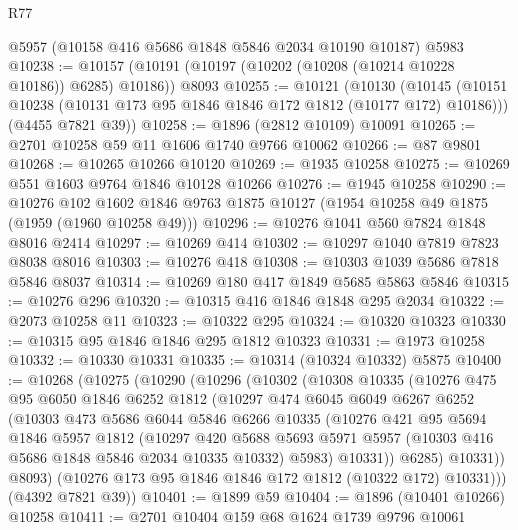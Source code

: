 \begin{lexlean}{R77}
\begin{coremodule}
    @5957
    (@10158 @416 @5686 @1848 @5846 @2034 @10190 @10187)
    @5983
@10238 := @10157 (@10191 (@10197 (@10202 (@10208 (@10214 @10228 @10186)) @6285) @10186)) @8093
@10255 := @10121
    (@10130
      (@10145 (@10151 @10238 (@10131 @173 @95 @1846 @1846 @172 @1812 (@10177 @172) @10186)))
      (@4455 @7821 @39))
@10258 := @1896 (@2812 @10109) @10091
@10265 := @2701 @10258 @59 @11 @1606 @1740 @9766 @10062
@10266 := @87 @9801
@10268 := @10265 @10266 @10120
@10269 := @1935 @10258
@10275 := @10269 @551 @1603 @9764 @1846 @10128 @10266
@10276 := @1945 @10258
@10290 := @10276
    @102
    @1602
    @1846
    @9763
    @1875
    @10127
    (@1954 @10258 @49 @1875 (@1959 (@1960 @10258 @49)))
@10296 := @10276 @1041 @560 @7824 @1848 @8016 @2414
@10297 := @10269 @414
@10302 := @10297 @1040 @7819 @7823 @8038 @8016
@10303 := @10276 @418
@10308 := @10303 @1039 @5686 @7818 @5846 @8037
@10314 := @10269 @180 @417 @1849 @5685 @5863 @5846
@10315 := @10276 @296
@10320 := @10315 @416 @1846 @1848 @295 @2034
@10322 := @2073 @10258 @11
@10323 := @10322 @295
@10324 := @10320 @10323
@10330 := @10315 @95 @1846 @1846 @295 @1812 @10323
@10331 := @1973 @10258
@10332 := @10330 @10331
@10335 := @10314 (@10324 @10332) @5875
@10400 := @10268
    (@10275
      (@10290
        (@10296
          (@10302
            (@10308
              @10335
              (@10276
                @475
                @95
                @6050
                @1846
                @6252
                @1812
                (@10297
                  @474
                  @6045
                  @6049
                  @6267
                  @6252
                  (@10303
                    @473
                    @5686
                    @6044
                    @5846
                    @6266
                    @10335
                    (@10276
                      @421
                      @95
                      @5694
                      @1846
                      @5957
                      @1812
                      (@10297
                        @420
                        @5688
                        @5693
                        @5971
                        @5957
                        (@10303 @416 @5686 @1848 @5846 @2034 @10335 @10332)
                        @5983)
                      @10331))
                  @6285)
                @10331))
            @8093)
          (@10276 @173 @95 @1846 @1846 @172 @1812 (@10322 @172) @10331)))
      (@4392 @7821 @39))
@10401 := @1899 @59
@10404 := @1896 (@10401 @10266) @10258
@10411 := @2701 @10404 @159 @68 @1624 @1739 @9796 @10061

\end{coremodule}
\end{lexlean}
